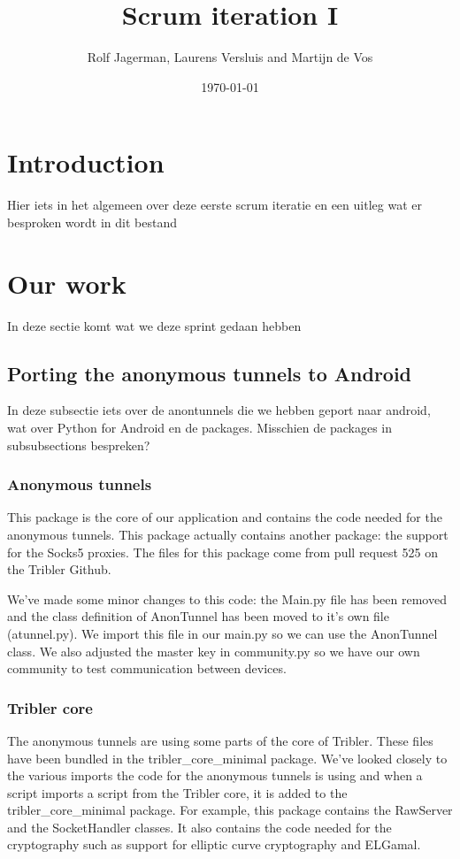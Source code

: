 \documentclass{article}
\title{Scrum iteration I}
\author{Rolf Jagerman, Laurens Versluis and Martijn de Vos}
\date{\today}
\begin{document}
\maketitle

\newpage

\section{Introduction}
Hier iets in het algemeen over deze eerste scrum iteratie en een uitleg wat er besproken wordt in dit bestand

\section{Our work}
In deze sectie komt wat we deze sprint gedaan hebben

\subsection{Porting the anonymous tunnels to Android}
In deze subsectie iets over de anontunnels die we hebben geport naar android, wat over Python for Android en de packages. Misschien de packages in subsubsections bespreken?

\subsubsection{Anonymous tunnels}
This package is the core of our application and contains the code needed for the anonymous tunnels. This package actually contains another package: the support for the Socks5 proxies. The files for this package come from pull request 525 on the Tribler Github.

We've made some minor changes to this code: the Main.py file has been removed and the class definition of AnonTunnel has been moved to it’s own file (atunnel.py). We import this file in our main.py so we can use the AnonTunnel class. We also adjusted the master key in community.py so we have our own community to test communication between devices.

\subsubsection{Tribler core}
The anonymous tunnels are using some parts of the core of Tribler. These files have been bundled in the tribler\_core\_minimal package. We’ve looked closely to the various imports the code for the anonymous tunnels is using and when a script imports a script from the Tribler core, it is added to the tribler\_core\_minimal package. For example, this package contains the RawServer and the SocketHandler classes. It also contains the code needed for the cryptography such as support for elliptic curve cryptography and ELGamal.
\end{document}
